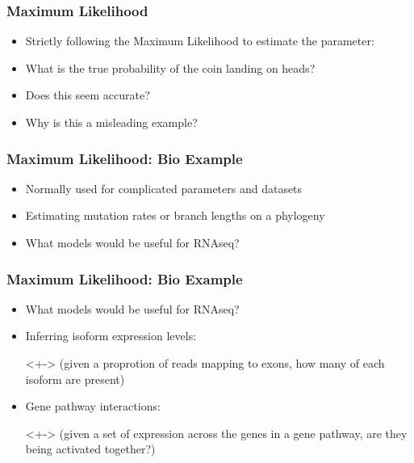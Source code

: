 \documentclass[14pt,handout]{beamer}
\begin{document}

\begin{frame}
\frametitle{Maximum Likelihood}
\begin{itemize}
	\item<+-> Strictly following the Maximum Likelihood to estimate the parameter:
	\item<+-> What is the true probability of the coin landing on heads?
	\item<+-> Does this seem accurate?
	\item<+-> Why is this a misleading example?
\end{itemize}
\end{frame}

\begin{frame}
\frametitle{Maximum Likelihood: Bio Example}
\begin{itemize}
	\item<+-> Normally used for complicated parameters and datasets
	\item<+-> Estimating mutation rates or branch lengths on a phylogeny
	\item<+-> What models would be useful for RNAseq?
\end{itemize}
\end{frame}

\begin{frame}
\frametitle{Maximum Likelihood: Bio Example}
\begin{itemize}
	\item<+-> What models would be useful for RNAseq?
	\item<+-> Inferring isoform expression levels:
	\item[]<+-> (given a proprotion of reads mapping to exons, how many of each isoform are present)
	\item<+-> Gene pathway interactions:
	\item[]<+-> (given a set of expression across the genes in a gene pathway, are they being activated together?)
\end{itemize}
\end{frame}
\end{document}
